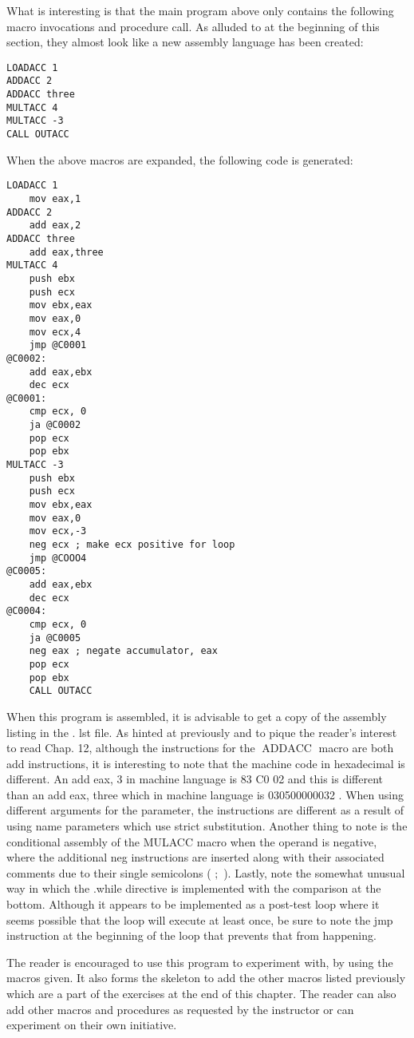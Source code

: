 \documentclass[10pt]{article}
\begin{document}
What is interesting is that the main program above only contains the following macro invocations and procedure call. As alluded to at the beginning of this section, they almost look like a new assembly language has been created:

\begin{verbatim}
LOADACC 1
ADDACC 2
ADDACC three
MULTACC 4
MULTACC -3
CALL OUTACC
\end{verbatim}

When the above macros are expanded, the following code is generated:

\begin{verbatim}
LOADACC 1
    mov eax,1
ADDACC 2
    add eax,2
ADDACC three
    add eax,three
MULTACC 4
    push ebx
    push ecx
    mov ebx,eax
    mov eax,0
    mov ecx,4
    jmp @C0001
@C0002:
    add eax,ebx
    dec ecx
@C0001:
    cmp ecx, 0
    ja @C0002
    pop ecx
    pop ebx
MULTACC -3
    push ebx
    push ecx
    mov ebx,eax
    mov eax,0
    mov ecx,-3
    neg ecx ; make ecx positive for loop
    jmp @COOO4
@C0005:
    add eax,ebx
    dec ecx
@C0004:
    cmp ecx, 0
    ja @C0005
    neg eax ; negate accumulator, eax
    pop ecx
    pop ebx
    CALL OUTACC
\end{verbatim}

When this program is assembled, it is advisable to get a copy of the assembly listing in the . lst file. As hinted at previously and to pique the reader's interest to read Chap. 12, although the instructions for the $\operatorname{ADDACC}$ macro are both add instructions, it is interesting to note that the machine code in hexadecimal is different. An add eax, 3 in machine language is 83 C0 02 and this is different than an add eax, three which in machine language is 030500000032 . When using different arguments for the parameter, the instructions are different as a result of using name parameters which use strict substitution. Another thing to note is the conditional assembly of the MULACC macro when the operand is negative, where the additional neg instructions are inserted along with their associated comments due to their single semicolons ( $;$ ). Lastly, note the somewhat unusual way in which the .while directive is implemented with the comparison at the bottom. Although it appears to be implemented as a post-test loop where it seems possible that the loop will execute at least once, be sure to note the jmp instruction at the beginning of the loop that prevents that from happening.

The reader is encouraged to use this program to experiment with, by using the macros given. It also forms the skeleton to add the other macros listed previously which are a part of the exercises at the end of this chapter. The reader can also add other macros and procedures as requested by the instructor or can experiment on their own initiative.
\end{document}
